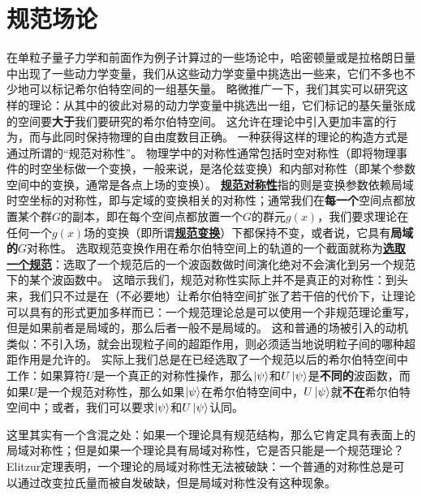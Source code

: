 \documentclass[hyperref, UTF8, a4paper]{ctexbook}
\newcommand{\concept}[1]{\underline{\textbf{#1}}}
\renewcommand{\emph}{\textbf}
\newcommand{\soliddoc}{\href{../solid/solid}{固体物理笔记}}
\begin{document}






\part{规范场论}

在单粒子量子力学和前面作为例子计算过的一些场论中，哈密顿量或是拉格朗日量中出现了一些动力学变量，我们从这些动力学变量中挑选出一些来，它们不多也不少地可以标记希尔伯特空间的一组基矢量。
略微推广一下，我们其实可以研究这样的理论：从其中的彼此对易的动力学变量中挑选出一组，它们标记的基矢量张成的空间要\emph{大于}我们要研究的希尔伯特空间。
这允许在理论中引入更加丰富的行为，而与此同时保持物理的自由度数目正确。
一种获得这样的理论的构造方式是通过所谓的“规范对称性”。
物理学中的对称性通常包括时空对称性（即将物理事件的时空坐标做一个变换，一般来说，是洛伦兹变换）和内部对称性（即某个参数空间中的变换，通常是各点上场的变换）。
\concept{规范对称性}指的则是变换参数依赖局域时空坐标的对称性，即与定域的变换相关的对称性；通常我们在\emph{每一个}空间点都放置某个群$G$的副本，即在每个空间点都放置一个$G$的群元$g(x)$，我们要求理论在任何一个$g(x)$场的变换（即所谓\concept{规范变换}）下都保持不变，或者说，它具有\emph{局域的}$G$对称性。
选取规范变换作用在希尔伯特空间上的轨道的一个截面就称为\concept{选取一个规范}：选取了一个规范后的一个波函数做时间演化绝对不会演化到另一个规范下的某个波函数中。
这暗示我们，规范对称性实际上并不是真正的对称性：到头来，我们只不过是在（不必要地）让希尔伯特空间扩张了若干倍的代价下，让理论可以具有的形式更加多样而已：一个规范理论总是可以使用一个非规范理论重写，但是如果前者是局域的，那么后者一般不是局域的。
这和普通的场被引入的动机类似：不引入场，就会出现粒子间的超距作用，则必须适当地说明粒子间的哪种超距作用是允许的。
实际上我们总是在已经选取了一个规范以后的希尔伯特空间中工作：如果算符$U$是一个真正的对称性操作，那么$\ket{\psi}$和$U \ket{\psi}$是\emph{不同的}波函数，而如果$U$是一个规范对称性，那么如果$\ket{\psi}$在希尔伯特空间中，$U \ket{\psi}$就\emph{不在}希尔伯特空间中；或者，我们可以要求$\ket{\psi}$和$U \ket{\psi}$认同。

这里其实有一个含混之处：如果一个理论具有规范结构，那么它肯定具有表面上的局域对称性；但是如果一个理论具有局域对称性，它是否只能是一个规范理论？
Elitzur定理\cite{Elitzur_1975}表明，一个理论的局域对称性无法被破缺：一个普通的对称性总是可以通过改变拉氏量而被自发破缺，但是局域对称性没有这种现象。
\end{document}
